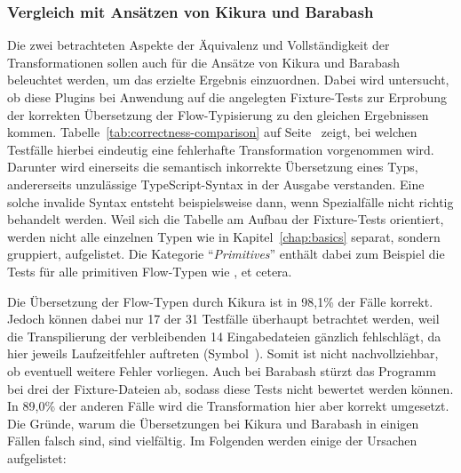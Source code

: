 \subsubsection{Vergleich mit Ansätzen von Kikura und Barabash}

Die zwei betrachteten Aspekte der Äquivalenz und Vollständigkeit der Transformationen sollen auch für die Ansätze von Kikura und Barabash beleuchtet werden, um das erzielte Ergebnis einzuordnen. Dabei wird untersucht, ob diese Plugins bei Anwendung auf die angelegten Fixture-Tests zur Erprobung der korrekten Übersetzung der Flow-Typisierung zu den gleichen Ergebnissen kommen.
Tabelle~\ref{tab:correctness-comparison} auf Seite~\pageref{tab:correctness-comparison} zeigt, bei welchen Testfälle hierbei eindeutig eine fehlerhafte Transformation vorgenommen wird. Darunter wird einerseits die semantisch inkorrekte Übersetzung eines Typs, andererseits unzulässige TypeScript-Syntax in der Ausgabe verstanden. Eine solche invalide Syntax entsteht beispielsweise dann, wenn Spezialfälle nicht richtig behandelt werden. Weil sich die Tabelle am Aufbau der Fixture-Tests orientiert, werden nicht alle einzelnen Typen wie in Kapitel~\ref{chap:basics} separat, sondern gruppiert, aufgelistet. Die Kategorie \enquote{\textit{Primitives}} enthält dabei zum Beispiel die Tests für alle primitiven Flow-Typen wie ,  et cetera.



Die Übersetzung der Flow-Typen durch Kikura ist in 98,1\% der Fälle korrekt. Jedoch können dabei nur 17 der 31 Testfälle überhaupt betrachtet werden, weil die Transpilierung der verbleibenden 14 Eingabedateien gänzlich fehlschlägt, da hier jeweils Laufzeitfehler auftreten (Symbol~\Lightning). Somit ist nicht nachvollziehbar, ob eventuell weitere Fehler vorliegen. Auch bei Barabash stürzt das Programm bei drei der Fixture-Dateien ab, sodass diese Tests nicht bewertet werden können. In 89,0\% der anderen Fälle wird die Transformation hier aber korrekt umgesetzt. Die Gründe, warum die Übersetzungen bei Kikura und Barabash in einigen Fällen falsch sind, sind vielfältig. Im Folgenden werden einige der Ursachen aufgelistet:

